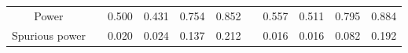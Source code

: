 % 
\begin{tabular}{ccccccccccc}
  \hline
  \hline
Power &  & 0.500 & 0.431 & 0.754 & 0.852 &  & 0.557 & 0.511 & 0.795 & 0.884 \\ 
  Spurious power &  & 0.020 & 0.024 & 0.137 & 0.212 &  & 0.016 & 0.016 & 0.082 & 0.192 \\ 
   \hline
\end{tabular}

